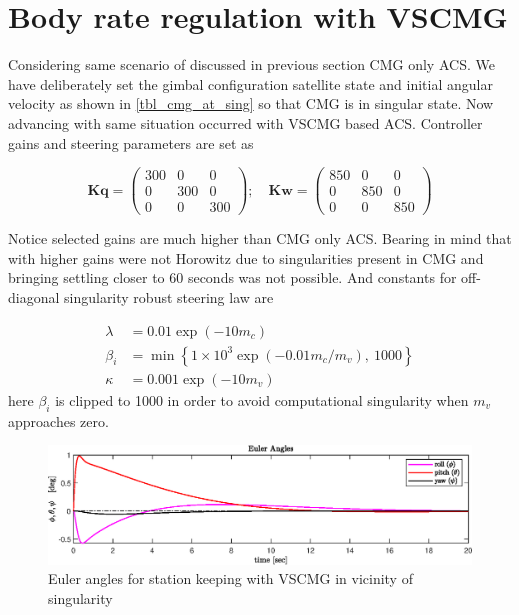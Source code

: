 \section{Body rate regulation with VSCMG}
Considering same scenario of discussed in previous section CMG only ACS. We have deliberately set the gimbal configuration satellite state and initial angular velocity as shown in \autoref{tbl_cmg_at_sing} so that CMG is in singular state. Now advancing with same situation occurred with VSCMG based ACS. Controller gains and steering parameters are set as

\begin{equation}
\mathbf{Kq} =\begin{pmatrix}
300 & 0 & 0\\
0 & 300 & 0\\
0 & 0 & 300
\end{pmatrix} ;\quad \mathbf{Kw} =\begin{pmatrix}
850 & 0 & 0\\
0 & 850 & 0\\
0 & 0 & 850
\end{pmatrix}
\end{equation}

\noindent Notice selected gains are much higher than CMG only ACS. Bearing in mind that with higher gains were not Horowitz due to singularities present in CMG and bringing settling closer to 60 seconds was not possible. 
\noindent And constants for off-diagonal singularity robust steering law are 

\begin{equation*}
\begin{aligned}
\lambda  & =0.01\exp( -10m_{c})\\
\beta _{i} & =\min\left\{1\times 10^{3}\exp( -0.01m_{c} /m_{v}) ,\ 1000\right\}\\
\kappa  & =0.001\exp( -10m_{v})
\end{aligned}
\end{equation*}
 here $\beta_i $ is clipped to 1000  in order to avoid computational singularity when $m_v$ approaches zero. \begin{figure}[H]
     \centering
    \includegraphics[width=0.9\columnwidth]{figures/plots/VSCMG/vs_reg_w10_ypr.eps}
    \caption{Euler angles for station keeping with VSCMG in vicinity of singularity}
    \label{plt:vs_reg_w10_ypr}
\end{figure}

